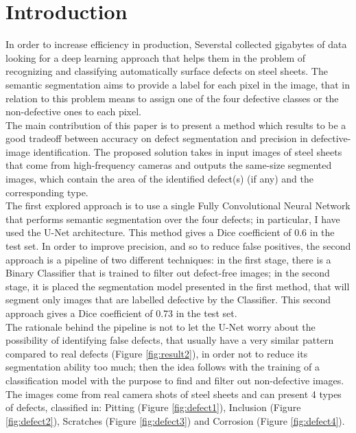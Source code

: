 \documentclass[10pt,twocolumn,letterpaper]{article}
\begin{document}
\section{Introduction}
   In order to increase efficiency in production, Severstal collected gigabytes of data looking for a deep learning approach that helps them in the problem of recognizing and classifying automatically surface defects on steel sheets. The semantic segmentation aims to provide a label for each pixel in the image, that in relation to this problem means to assign one of the four defective classes or the non-defective ones to each pixel.\\
   The main contribution of this paper is to present a method which results to be a good tradeoff between accuracy on defect segmentation and precision in defective-image identification. The proposed solution takes in input images of steel sheets that come from high-frequency cameras and outputs the same-size segmented images, which contain the area of the identified defect(s) (if any) and the corresponding type. \\
   The first explored approach is to use a single Fully Convolutional Neural Network that performs semantic segmentation over the four defects; in particular, I have used the U-Net architecture. This method gives a Dice coefficient of 0.6 in the test set.
   In order to improve precision, and so to reduce false positives, the second approach is a pipeline of two different techniques: in the first stage, there is a Binary Classifier that is trained to filter out defect-free images; in the second stage, it is placed the segmentation model presented in the first method, that will segment only images that are labelled defective by the Classifier. This second approach gives a Dice coefficient of 0.73 in the test set.\\ 
   The rationale behind the pipeline is not to let the U-Net worry about the possibility of identifying false defects, that usually have a very similar pattern compared to real defects (Figure \ref{fig:result2}), in order not to reduce its segmentation ability too much; then the idea follows with the training of a classification model with the purpose to find and filter out non-defective images.\\
   The images come from real camera shots of steel sheets and can present 4 types of defects, classified in: Pitting (Figure \ref{fig:defect1}), Inclusion (Figure \ref{fig:defect2}), Scratches (Figure \ref{fig:defect3}) and Corrosion (Figure \ref{fig:defect4}).
   
\end{document}
